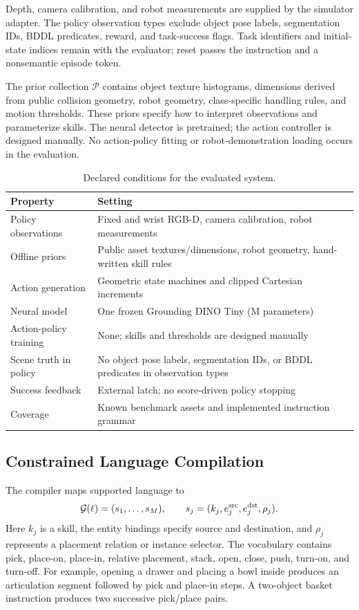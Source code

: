 \documentclass[letterpaper,10pt,conference]{ieeeconf}
\begin{document}
Depth, camera calibration, and robot measurements are supplied by the
simulator adapter. The policy observation types exclude object pose labels,
segmentation IDs, BDDL predicates, reward, and task-success flags. Task
identifiers and initial-state indices remain with the evaluator; reset passes
the instruction and a nonsemantic episode token.

The prior collection $\mathcal{P}$ contains object texture histograms,
dimensions derived from public collision geometry, robot geometry,
class-specific handling rules, and motion thresholds. These priors specify
how to interpret observations and parameterize skills. The neural detector
is pretrained; the action controller is designed manually. No action-policy
fitting or robot-demonstration loading occurs in the evaluation.

\begin{table}[t]
\caption{Declared conditions for the evaluated system.}
\label{tab:conditions}
\centering
\footnotesize
\begin{tabular}{@{}p{}p{}@{}}
\toprule
Property & Setting \\
\midrule
Policy observations & Fixed and wrist RGB-D, camera calibration, robot measurements \\
Offline priors & Public asset textures/dimensions, robot geometry, hand-written skill rules \\
Action generation & Geometric state machines and clipped Cartesian increments \\
Neural model & One frozen Grounding DINO Tiny (\NeuralMillion{}M parameters) \\
Action-policy training & None; skills and thresholds are designed manually \\
Scene truth in policy & No object pose labels, segmentation IDs, or BDDL predicates in observation types \\
Success feedback & External latch; no score-driven policy stopping \\
Coverage & Known benchmark assets and implemented instruction grammar \\
\bottomrule
\end{tabular}
\end{table}

\subsection{Constrained Language Compilation}
The compiler maps supported language to
\begin{equation}
 \mathcal{G}(\ell)=(s_1,\ldots,s_M),\qquad
 s_j=(k_j,e_j^{\rm src},e_j^{\rm dst},\rho_j).
\end{equation}
Here $k_j$ is a skill, the entity bindings specify source and destination,
and $\rho_j$ represents a placement relation or instance selector.
The vocabulary contains pick, place-on, place-in, relative placement,
stack, open, close, push, turn-on, and turn-off. For example, opening a
drawer and placing a bowl inside produces an articulation segment followed
by pick and place-in steps. A two-object basket instruction produces two
successive pick/place pairs.
\end{document}
